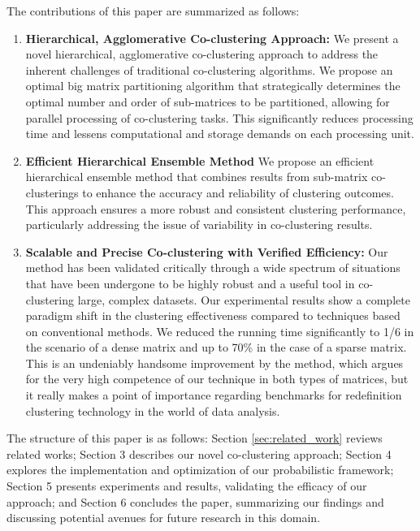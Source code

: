The contributions of this paper are summarized as follows:
\begin{enumerate}
    \item \textbf{Hierarchical, Agglomerative Co-clustering Approach: }We present a novel hierarchical, agglomerative co-clustering approach to address the inherent challenges of traditional co-clustering algorithms. We propose an optimal big matrix partitioning algorithm that strategically determines the optimal number and order of sub-matrices to be partitioned, allowing for parallel processing of co-clustering tasks. This significantly reduces processing time and lessens computational and storage demands on each processing unit.
    \item \textbf{Efficient Hierarchical Ensemble Method} We propose an efficient hierarchical ensemble method that combines results from sub-matrix co-clusterings to enhance the accuracy and reliability of clustering outcomes. This approach ensures a more robust and consistent clustering performance, particularly addressing the issue of variability in co-clustering results.
    \item \textbf{Scalable and Precise Co-clustering with Verified Efficiency: } Our method has been validated critically through a wide spectrum of situations that have been undergone to be highly robust and a useful tool in co-clustering large, complex datasets. Our experimental results show a complete paradigm shift in the clustering effectiveness compared to techniques based on conventional methods. 
    We reduced the running time significantly to 1/6 in the scenario of a dense matrix and up to 70\% in the case of a sparse matrix.
    This is an undeniably handsome improvement by the method, which argues for the very high competence of our technique in both types of matrices, but it really makes a point of importance regarding benchmarks for redefinition clustering technology in the world of data analysis. 
\end{enumerate}

The structure of this paper is as follows: Section \ref{sec:related_work} reviews related works; Section 3 describes our novel co-clustering approach; Section 4 explores the implementation and optimization of our probabilistic framework; Section 5 presents experiments and results, validating the efficacy of our approach; and Section 6 concludes the paper, summarizing our findings and discussing potential avenues for future research in this domain.
 